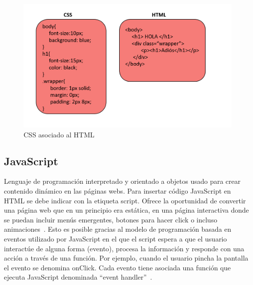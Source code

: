 \documentclass[a4paper, 12pt]{book}
\begin{document}
\begin{figure}[h]
        \centering
        \includegraphics[scale=0.4]{img/cssyhtml.PNG}
        \caption{CSS asociado al HTML}
        \label{figura:css}
\end{figure}

\subsection{JavaScript}
Lenguaje de programación interpretado y orientado a objetos usado para crear contenido dinámico en las páginas webs. Para insertar código JavaScript en HTML se debe indicar con la etiqueta script. Ofrece la oportunidad de convertir una página web que en un principio era estática, en una página interactiva donde se puedan incluir menús emergentes, botones para hacer click o incluso animaciones~\cite{mdn1}. Esto es posible gracias al modelo de programación basada en eventos utilizado por JavaScript en el que el script espera a que el usuario interactúe de alguna forma (evento), procesa la información y responde con una acción a través de una función. Por ejemplo, cuando el usuario pincha la pantalla el evento se denomina onClick. Cada evento tiene asociada una función que ejecuta JavaScript denominada ``event handler''~\cite{perez2019introduccion}.
\end{document}
